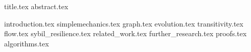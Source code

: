 \documentclass[conference]{IEEEtran}
\begin{document}
{title.tex}
{abstract.tex}

{introduction.tex}
{simplemechanics.tex}
{graph.tex}
{evolution.tex}
{transitivity.tex}
{flow.tex}
{sybil_resilience.tex}
{related_work.tex}
{further_research.tex}
{proofs.tex}
{algorithms.tex}

\end{document}
